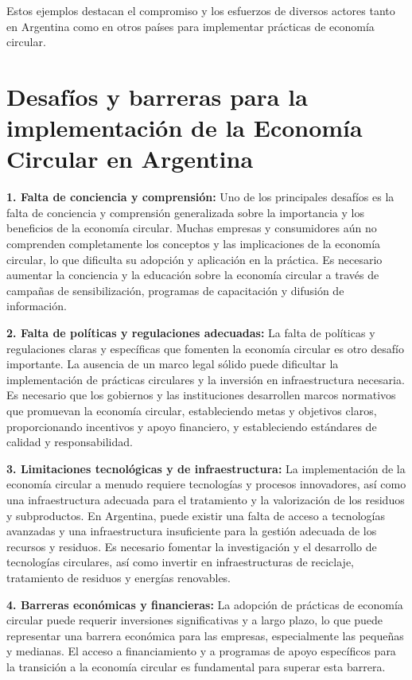 \documentclass[runningheads]{llncs}
\begin{document}
Estos ejemplos destacan el compromiso y los esfuerzos de diversos actores tanto en Argentina como en otros países para implementar prácticas de economía circular. 

\section{Desafíos y barreras para la implementación de la Economía Circular en Argentina}

\hspace{0.5cm} \textbf{1. Falta de conciencia y comprensión:} Uno de los principales desafíos es la falta de conciencia y comprensión generalizada sobre la importancia y los beneficios de la economía circular. Muchas empresas y consumidores aún no comprenden completamente los conceptos y las implicaciones de la economía circular, lo que dificulta su adopción y aplicación en la práctica. Es necesario aumentar la conciencia y la educación sobre la economía circular a través de campañas de sensibilización, programas de capacitación y difusión de información.


\textbf{2. Falta de políticas y regulaciones adecuadas:} La falta de políticas y regulaciones claras y específicas que fomenten la economía circular es otro desafío importante. La ausencia de un marco legal sólido puede dificultar la implementación de prácticas circulares y la inversión en infraestructura necesaria. Es necesario que los gobiernos y las instituciones desarrollen marcos normativos que promuevan la economía circular, estableciendo metas y objetivos claros, proporcionando incentivos y apoyo financiero, y estableciendo estándares de calidad y responsabilidad.


\textbf{3. Limitaciones tecnológicas y de infraestructura:} La implementación de la economía circular a menudo requiere tecnologías y procesos innovadores, así como una infraestructura adecuada para el tratamiento y la valorización de los residuos y subproductos. En Argentina, puede existir una falta de acceso a tecnologías avanzadas y una infraestructura insuficiente para la gestión adecuada de los recursos y residuos. Es necesario fomentar la investigación y el desarrollo de tecnologías circulares, así como invertir en infraestructuras de reciclaje, tratamiento de residuos y energías renovables.


\textbf{4. Barreras económicas y financieras:} La adopción de prácticas de economía circular puede requerir inversiones significativas y a largo plazo, lo que puede representar una barrera económica para las empresas, especialmente las pequeñas y medianas. El acceso a financiamiento y a programas de apoyo específicos para la transición a la economía circular es fundamental para superar esta barrera.
\end{document}
